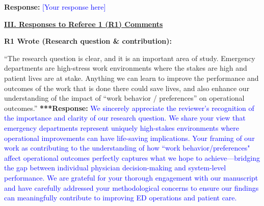 \documentclass[11pt]{article}
\newenvironment{quote2}
{ \bigskip
\noindent
         \small\em
         \baselineskip=14pt
}
\newcommand{\1}{\hbox{\rm 1\kern-.35em 1}}
\begin{document}
{\begin{quote2}
\end{quote2}

\noindent\textbf{Response:} \textcolor{blue}{[Your response here]}




\clearpage


\pagestyle{fancy}
\fancyhead{}
\renewcommand{\headrulewidth}{0pt}

\noindent\underline{\textbf{III. Responses to Referee 1 (R1) Comments}}

\begin{quote2}
\textbf{R1 Wrote (Research question \& contribution):}  

\noindent``The research question is clear, and it is an important area of study. Emergency departments are
high-stress work environments where the stakes are high and patient lives are at stake.
Anything we can learn to improve the performance and outcomes of the work that is done there
could save lives, and also enhance our understanding of the impact of “work behavior /
preferences” on operational outcomes.” 
\end{quote2}

\noindent\textbf{***Response:} \textcolor{blue}{We sincerely appreciate the reviewer's recognition of the importance and clarity of our research question. We share your view that emergency departments represent uniquely high-stakes environments where operational improvements can have life-saving implications. Your framing of our work as contributing to the understanding of how ``work behavior/preferences" affect operational outcomes perfectly captures what we hope to achieve—bridging the gap between individual physician decision-making and system-level performance. We are grateful for your thorough engagement with our manuscript and have carefully addressed your methodological concerns to ensure our findings can meaningfully contribute to improving ED operations and patient care.}


}
\end{document}
